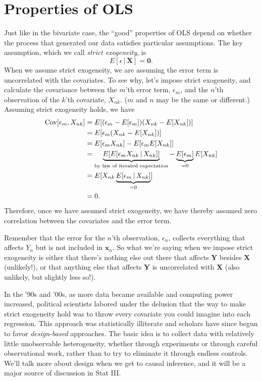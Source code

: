 \documentclass[12pt,oneside,openany]{book}
\begin{document}
\section{Properties of OLS}\label{properties-of-ols}

Just like in the bivariate case, the ``good'' properties of OLS depend
on whether the process that generated our data satisfies particular
assumptions. The key assumption, which we call \emph{strict exogeneity},
is \[
E[\epsilon \,|\, \mathbf{X}] = \mathbf{0}.
\] When we assume strict exogeneity, we are assuming the error term is
uncorrelated with the covariates. To see why, let's impose strict
exogeneity, and calculate the covariance between the \(m\)'th error
term, \(\epsilon_m\), and the \(n\)'th observation of the \(k\)'th
covariate, \(X_{nk}\). (\(m\) and \(n\) may be the same or different.)
Assuming strict exogeneity holds, we have \[
\begin{aligned}
\mathop{\rm Cov}\nolimits[\epsilon_m, X_{nk}]
&= E[(\epsilon_m - E[\epsilon_m])(X_{nk} - E[X_{nk}])] \\
&= E[ \epsilon_m (X_{nk} - E[X_{nk}]) ] \\
&= E[ \epsilon_m X_{nk} ] - E [ \epsilon_m E[X_{nk}] ] \\
&= \underbrace{E[ E[ \epsilon_m X_{nk} \,|\, X_{nk} ] ]}_{\text{by law of iterated expectation}} - \underbrace{E [\epsilon_m]}_{= 0} E[ X_{nk} ] \\
&= E[ X_{nk} \underbrace{E[\epsilon_m \,|\, X_{nk}]}_{=0} ] \\
&= 0.
\end{aligned}
\] Therefore, once we have assumed strict exogeneity, we have thereby
assumed zero correlation between the covariates and the error term.

Remember that the error for the \(n\)'th observation, \(\epsilon_n\),
collects everything that affects \(Y_n\) but is not included in
\(\mathbf{x}_n\). So what we're saying when we impose strict exogeneity
is either that there's nothing else out there that affects
\(\mathbf{Y}\) besides \(\mathbf{X}\) (unlikely!), or that anything else
that affects \(\mathbf{Y}\) is uncorrelated with \(\mathbf{X}\) (also
unlikely, but slightly less so!).

In the '90s and '00s, as more data became available and computing power
increased, political scientists labored under the delusion that the way
to make strict exogeneity hold was to throw every covariate you could
imagine into each regression. This approach was statistically illiterate
\citep{clarke2005phantom} and scholars have since begun to favor
\emph{design-based} approaches. The basic idea is to collect data with
relatively little unobservable heterogeneity, whether through
experiments or through careful observational work, rather than to try to
eliminate it through endless controls. We'll talk more about design when
we get to causal inference, and it will be a major source of discussion
in Stat III.
\end{document}
